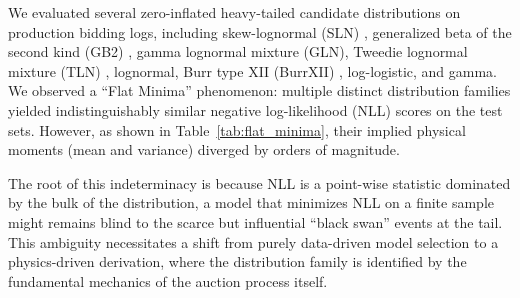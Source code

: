 \documentclass[sigconf, anonymous, review]{acmart}
\begin{document}
We evaluated several zero-inflated heavy-tailed candidate distributions on production bidding logs, including skew-lognormal (SLN) \cite{azzalini1985class}, generalized beta of the second kind (GB2) \cite{mcdonald2008some}, gamma lognormal mixture (GLN), Tweedie lognormal mixture (TLN) \cite{tweedie1984index}, lognormal, Burr type XII (BurrXII) \cite{burr1942cumulative}, log-logistic, and gamma.
We observed a ``Flat Minima'' phenomenon: multiple distinct distribution families yielded indistinguishably similar negative log-likelihood (NLL) scores on the test sets. However, as shown in Table~\ref{tab:flat_minima}, their implied physical moments (mean and variance) diverged by orders of magnitude.

\begin{table}[t]
\centering
\caption{Comparison of goodness-of-fit and moment estimation for predicted GMV (PGMV).}
\label{tab:flat_minima}
{}
\end{table}

The root of this indeterminacy is because NLL is a point-wise statistic dominated by the bulk of the distribution, a model that minimizes NLL on a finite sample might remains blind to the scarce but influential ``black swan'' events at the tail.
This ambiguity necessitates a shift from purely data-driven model selection to a physics-driven derivation, where the distribution family is identified by the fundamental mechanics of the auction process itself.
\end{document}
